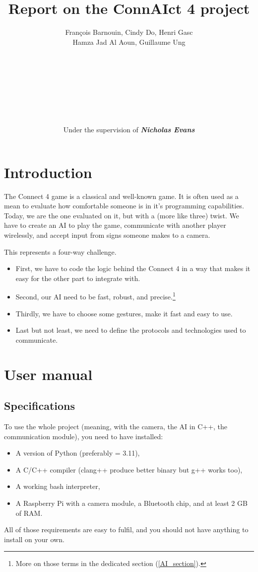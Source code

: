\documentclass[12pt, a4paper, oneside]{report}
\title{\textbf{Report on the ConnAIct 4 project}}
\author{\normalsize François Barnouin, Cindy Do, Henri Gasc\\\normalsize Hamza Jad Al Aoun, Guillaume Ung\\\\\\\\\\\\\\\\\\Under the supervision of \textbf{\textit{Nicholas Evans}}}
\date{}
\begin{document}
	\maketitle
	\tableofcontents

	\chapter{Introduction}
	The Connect 4 game is a classical and well-known game. It is often used as a mean to evaluate how comfortable someone is in it's programming capabilities. \\
	Today, we are the one evaluated on it, but with a (more like three) twist. We have to create an AI to play the game, communicate with another player wirelessly, and accept input from signs someone makes to a camera.

	This represents a four-way challenge.
	\begin{itemize}
		\item First, we have to code the logic behind the Connect 4 in a way that makes it easy for the other part to integrate with.
		\item Second, our AI need to be fast, robust, and precise.\footnote{More on those terms in the dedicated section (\ref{AI_section}).}
		\item Thirdly, we have to choose some gestures, make it fast and easy to use.
		\item Last but not least, we need to define the protocols and technologies used to communicate.
	\end{itemize}

	\chapter{User manual}

	\section{Specifications}
	To use the whole project (meaning, with the camera, the AI in C++, the communication module), you need to have installed:
	\begin{itemize}
		\item A version of Python (preferably \>= 3.11),
		\item A C/C++ compiler (clang++ produce better binary but g++ works too),
		\item A working bash interpreter,
		\item A Raspberry Pi with a camera module, a Bluetooth chip, and at least 2 GB of RAM.
	\end{itemize}
	All of those requirements are easy to fulfil, and you should not have anything to install on your own. \\
\end{document}

